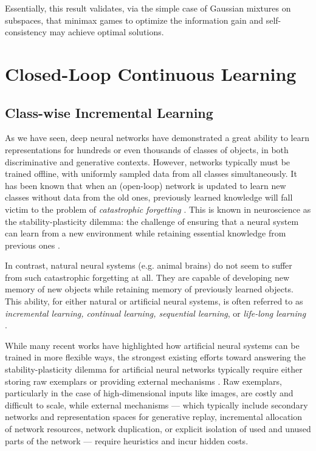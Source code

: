 \documentclass[../../book-main.tex]{subfiles}
\begin{document}
Essentially, this result validates, via the simple case of Gaussian mixtures on subspaces, that minimax games to optimize the information gain and self-consistency may achieve optimal solutions.






\section{Closed-Loop Continuous Learning}
\label{sec:continuous}

\subsection{Class-wise Incremental Learning}
\label{sec:class-wise-incremental}

As we have seen, deep neural networks have demonstrated a great ability to learn representations for hundreds or even thousands of classes of objects, in both discriminative and generative contexts. However, networks typically must be trained offline, with uniformly sampled data from all classes simultaneously. It has been known that when an (open-loop) network is updated to learn new classes without data from the old ones, previously learned knowledge will fall victim to the problem of {\em catastrophic forgetting} \cite{McCloskey1989catastrophic}. This is known in neuroscience as the stability-plasticity dilemma: the challenge of ensuring that a neural system can learn from a new environment while retaining essential knowledge from previous ones \cite{Grossberg1987CompetitiveLF}.

In contrast, natural neural systems (e.g. animal brains) do not seem to suffer from such catastrophic forgetting at all. They are capable of developing new memory of new objects while retaining memory of previously learned objects. This ability, for either natural or artificial neural systems, is often referred to as {\em  incremental learning, continual learning, sequential learning}, or {\em life-long learning}~ \cite{controlled-forgetting}.



While many recent works have highlighted how artificial neural systems can be  trained in more flexible ways, the strongest existing efforts toward answering the stability-plasticity dilemma for artificial neural networks typically require either storing raw exemplars \cite{icarl,chaudhry2019tiny} or providing external mechanisms \cite{EWC}. Raw exemplars, particularly in the case of high-dimensional inputs like images, are costly and difficult to scale, while external mechanisms --- which typically include secondary networks and representation spaces for generative replay, incremental allocation of network resources, network duplication, or explicit isolation of used and unused parts of the network --- require heuristics and incur hidden costs.
\end{document}
